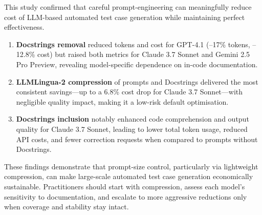 This study confirmed that careful prompt-engineering can meaningfully reduce cost of LLM-based automated test case generation while maintaining perfect effectiveness.

\begin{enumerate}
    \item \textbf{Docstrings removal} reduced tokens and cost for GPT-4.1 (–17\% tokens, –12.8\% cost) but raised both metrics for Claude 3.7 Sonnet and Gemini 2.5 Pro Preview, revealing model-specific dependence on in-code documentation.
    \vspace{0.3cm}
    
    \item \textbf{LLMLingua-2 compression} of prompts and Docstrings delivered the most consistent savings—up to a 6.8\% cost drop for Claude 3.7 Sonnet—with negligible quality impact, making it a low-risk default optimisation.
    \vspace{0.3cm}
    
    \item \textbf{Docstrings inclusion} notably enhanced code comprehension and output quality for Claude 3.7 Sonnet, leading to lower total token usage, reduced API costs, and fewer correction requests when compared to prompts without Docstrings.
\end{enumerate}


These findings demonstrate that prompt-size control, particularly via lightweight compression, can make large-scale automated test case generation economically sustainable. Practitioners should start with compression, assess each model’s sensitivity to documentation, and escalate to more aggressive reductions only when coverage and stability stay intact.
